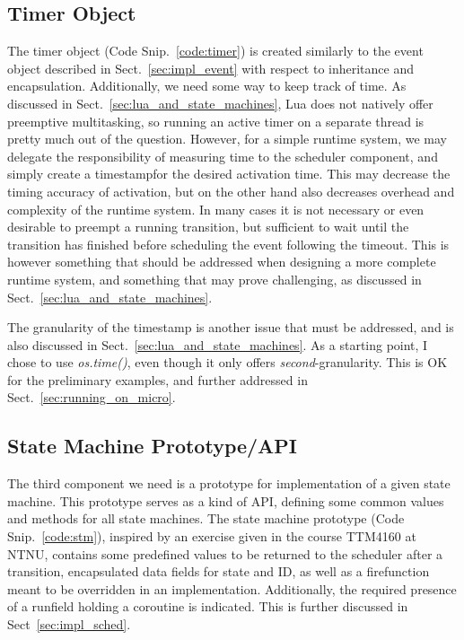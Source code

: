\subsection{Timer Object}
\label{sec:impl_timer}
The timer object (Code Snip.~\ref{code:timer}) is created similarly to the event object described in Sect.~\ref{sec:impl_event} with respect to inheritance and encapsulation. Additionally, we need some way to keep track of time. As discussed in Sect.~\ref{sec:lua_and_state_machines}, Lua does not natively offer preemptive multitasking, so running an active timer on a separate thread is pretty much out of the question. However, for a simple runtime system, we may delegate the responsibility of measuring time to the scheduler component, and simply create a \guillemotleft timestamp\guillemotright for the desired activation time. This may decrease the timing accuracy of activation, but on the other hand also decreases overhead and complexity of the runtime system. In many cases it is not necessary or even desirable to preempt a running transition, but sufficient to wait until the transition has finished before scheduling the event following the timeout. This is however something that should be addressed when designing a more complete runtime system, and something that may prove challenging, as discussed in Sect.~\ref{sec:lua_and_state_machines}.

The granularity of the timestamp is another issue that must be addressed, and is also discussed in Sect.~\ref{sec:lua_and_state_machines}. As a starting point, I chose to use \emph{os.time()}, even though it only offers \emph{second}-granularity. This is OK for the preliminary examples, and further addressed in Sect.~\ref{sec:running_on_micro}.

\subsection{State Machine Prototype/API}
The third component we need is a prototype for implementation of a given state machine. This prototype serves as a kind of API, defining some common values and methods for all state machines. The state machine prototype (Code Snip.~\ref{code:stm}), inspired by an exercise given in the course TTM4160 at NTNU, contains some predefined values to be returned to the scheduler after a transition, encapsulated data fields for state and ID, as well as a \guillemotleft fire\guillemotright function meant to be overridden in an implementation. Additionally, the required presence of a \guillemotleft run\guillemotright field holding a coroutine is indicated. This is further discussed in Sect~\ref{sec:impl_sched}.

